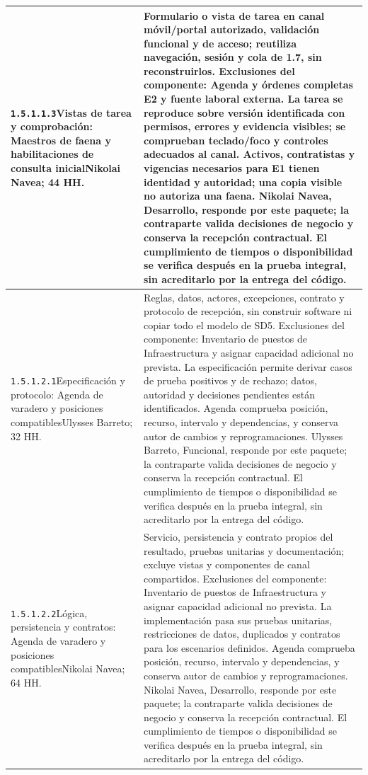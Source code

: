 \begin{longtable}{L{52mm}L{91mm}}
\texttt{1.\allowbreak{}5.\allowbreak{}1.\allowbreak{}1.\allowbreak{}3}\newline Vistas de tarea y comprobación: Maestros de faena y habilitaciones de consulta inicial\newline Nikolai Navea; 44 HH. & Formulario o vista de tarea en canal móvil/portal autorizado, validación funcional y de acceso; reutiliza navegación, sesión y cola de 1.7, sin reconstruirlos. Exclusiones del componente: Agenda y órdenes completas E2 y fuente laboral externa. La tarea se reproduce sobre versión identificada con permisos, errores y evidencia visibles; se comprueban teclado/foco y controles adecuados al canal. Activos, contratistas y vigencias necesarios para E1 tienen identidad y autoridad; una copia visible no autoriza una faena. Nikolai Navea, Desarrollo, responde por este paquete; la contraparte valida decisiones de negocio y conserva la recepción contractual. El cumplimiento de tiempos o disponibilidad se verifica después en la prueba integral, sin acreditarlo por la entrega del código.\\\hline
\texttt{1.\allowbreak{}5.\allowbreak{}1.\allowbreak{}2.\allowbreak{}1}\newline Especificación y protocolo: Agenda de varadero y posiciones compatibles\newline Ulysses Barreto; 32 HH. & Reglas, datos, actores, excepciones, contrato y protocolo de recepción, sin construir software ni copiar todo el modelo de SD5. Exclusiones del componente: Inventario de puestos de Infraestructura y asignar capacidad adicional no prevista. La especificación permite derivar casos de prueba positivos y de rechazo; datos, autoridad y decisiones pendientes están identificados. Agenda comprueba posición, recurso, intervalo y dependencias, y conserva autor de cambios y reprogramaciones. Ulysses Barreto, Funcional, responde por este paquete; la contraparte valida decisiones de negocio y conserva la recepción contractual. El cumplimiento de tiempos o disponibilidad se verifica después en la prueba integral, sin acreditarlo por la entrega del código.\\\hline
\texttt{1.\allowbreak{}5.\allowbreak{}1.\allowbreak{}2.\allowbreak{}2}\newline Lógica, persistencia y contratos: Agenda de varadero y posiciones compatibles\newline Nikolai Navea; 64 HH. & Servicio, persistencia y contrato propios del resultado, pruebas unitarias y documentación; excluye vistas y componentes de canal compartidos. Exclusiones del componente: Inventario de puestos de Infraestructura y asignar capacidad adicional no prevista. La implementación pasa sus pruebas unitarias, restricciones de datos, duplicados y contratos para los escenarios definidos. Agenda comprueba posición, recurso, intervalo y dependencias, y conserva autor de cambios y reprogramaciones. Nikolai Navea, Desarrollo, responde por este paquete; la contraparte valida decisiones de negocio y conserva la recepción contractual. El cumplimiento de tiempos o disponibilidad se verifica después en la prueba integral, sin acreditarlo por la entrega del código.\\\hline

\end{longtable}
